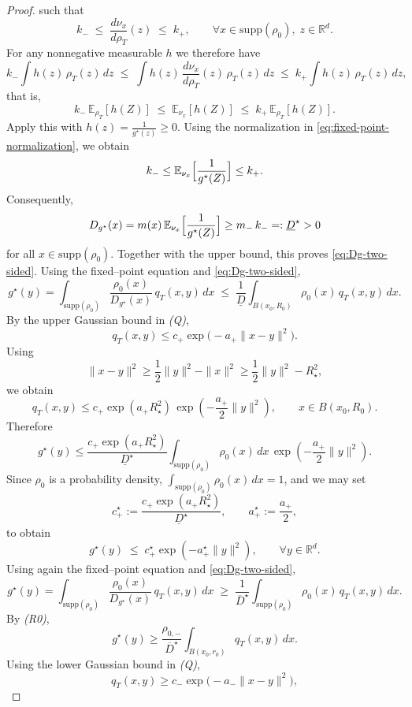 \documentclass[11pt]{article}
\theoremstyle{remark}
\numberwithin{equation}{section}
\newcommand{\R}{\mathbb{R}}
\newcommand{\E}{\mathbb{E}}
\def\amin{a_{-}}
\def\amax{a_{+}}
\def\cmin{c_{-}}
\def\cmax{c_{+}}
\def\rhomin{\rho_{0,-}}
\def\aStarmax{a_{+}^\star}
\def\cStarmax{c_{+}^\star}
\begin{document}
\begin{proof}
such that
\[
  k_- \;\le\; \frac{d\nu_x}{d\rho_T}(z) \;\le\; k_+,
  \qquad
  \forall x\in\mathrm{supp}(\rho_0),\; z\in\mathbb{R}^d.
\]
For any nonnegative measurable $h$ we therefore have
\[
  k_- \int h(z)\,\rho_T(z)\,dz
  \;\le\;
  \int h(z)\,\frac{d\nu_x}{d\rho_T}(z)\,\rho_T(z)\,dz
  \;\le\;
  k_+ \int h(z)\,\rho_T(z)\,dz,
\]
that is,
\[
  k_-\,\mathbb{E}_{\rho_T}[h(Z)]
  \;\le\;
  \mathbb{E}_{\nu_x}[h(Z)]
  \;\le\;
  k_+\, \E_{\rho_T}[h(Z)].
\]
Apply this with $h(z) = \frac{1}{g^\star(z)}\ge 0$. Using the normalization in
\eqref{eq:fixed-point-normalization}, we obtain
\[
  k_- \le \mathbb{E}_{\nu_x}\Bigl[\frac{1}{g^\star(Z)}\Bigr] \le k_+.
\]
Consequently,
\begin{equation}
     \label{Dmin def}
     D_{g^\star}(x)
  =
  m(x)\,\mathbb{E}_{\nu_x}\Bigl[\frac{1}{g^\star(Z)}\Bigr]
  \ge
  m_-\,k_- =: \underline{D}^\star > 0
\end{equation}
for all $x\in\mathrm{supp}(\rho_0)$. Together with the upper bound, this proves
\eqref{eq:Dg-two-sided}.
Using the fixed--point equation and \eqref{eq:Dg-two-sided},
\[
  g^\star(y)
  =
  \int_{\mathrm{supp}(\rho_0)}
    \frac{\rho_0(x)}{D_{g^\star}(x)}\,q_T(x,y)\,dx
  \;\le\;
  \frac{1}{\underline{D}}
  \int_{B(x_0,R_0)} \rho_0(x)\,q_T(x,y)\,dx.
\]
 By the upper Gaussian bound in \emph{(Q)},
\[
  q_T(x,y)
  \le
  \cmax \exp\bigl(-\amax \|x-y\|^2\bigr).
\]
Using
\[
  \|x-y\|^2
  \ge \frac{1}{2}\|y\|^2 - \|x\|^2
  \ge \frac{1}{2}\|y\|^2 - R_\star^2,
\]
we obtain
\[
  q_T(x,y)
  \le
  \cmax \exp(\amax R_\star^2)\,\exp\!\left(-\frac{\amax}{2}\|y\|^2\right),
  \qquad x\in B(x_0,R_0).
\]
Therefore
\[
  g^\star(y)
  \le
  \frac{\cmax \exp(\amax R_\star^2)}{\underline{D}^\star}
  \int_{\mathrm{supp}(\rho_0)} \rho_0(x)\,dx\,
  \exp\!\left(-\frac{\amax}{2}\|y\|^2\right).
\]
Since $\rho_0$ is a probability density, $\int_{\mathrm{supp}(\rho_0)}\rho_0(x)\,dx = 1$, and we
may set
\[
  \cStarmax
  := \frac{\cmax \exp(\amax R_\star^2)}{\underline{D}^\star},
  \qquad
  \aStarmax := \frac{\amax}{2},
\]
to obtain
\[
  g^\star(y)
  \;\le\;
  \cStarmax \exp(- \aStarmax  \|y\|^2),
  \qquad \forall y\in \R^d.
\]
Using again the fixed--point equation and \eqref{eq:Dg-two-sided},
\[
  g^\star(y)
  =
  \int_{\mathrm{supp}(\rho_0)}
    \frac{\rho_0(x)}{D_{g^\star}(x)}\,q_T(x,y)\,dx
  \;\ge\;
  \frac{1}{\overline{D}^\star}
  \int_{\mathrm{supp}(\rho_0)} \rho_0(x)\,q_T(x,y)\,dx.
\]
By \emph{(R0)},
\[
  g^\star(y)
  \ge
  \frac{\rhomin}{\overline{D}^\star}
  \int_{B(x_0,r_0)} q_T(x,y)\,dx.
\]
Using the lower Gaussian bound in \emph{(Q)},
\[
  q_T(x,y) \ge \cmin \exp\bigl(-\amin \|x-y\|^2\bigr),
\]
\end{proof}
\end{document}
